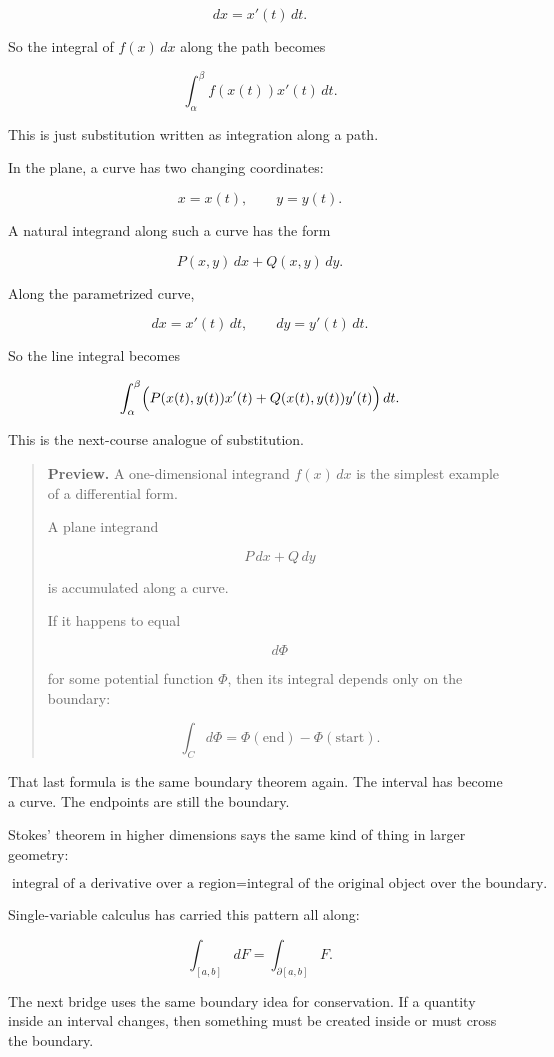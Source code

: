 \[
dx=x'(t)\,dt.
\]

So the integral of \(f(x)\,dx\) along the path becomes

\[
\int_{\alpha}^{\beta} f(x(t))x'(t)\,dt.
\]

This is just substitution written as integration along a path.

In the plane, a curve has two changing coordinates:

\[
x=x(t),
\qquad
y=y(t).
\]

A natural integrand along such a curve has the form

\[
P(x,y)\,dx+Q(x,y)\,dy.
\]

Along the parametrized curve,

\[
dx=x'(t)\,dt,
\qquad
dy=y'(t)\,dt.
\]

So the line integral becomes

\[
\int_{\alpha}^{\beta}
\Bigl(P(x(t),y(t))x'(t)+Q(x(t),y(t))y'(t)\Bigr)\,dt.
\]

This is the next-course analogue of substitution.

\begin{quote}
\textbf{Preview.}
A one-dimensional integrand \(f(x)\,dx\) is the simplest example of a differential
form.

A plane integrand

\[
P\,dx+Q\,dy
\]

is accumulated along a curve.

If it happens to equal

\[
d\Phi
\]

for some potential function \(\Phi\), then its integral depends only on the boundary:

\[
\int_C d\Phi=\Phi(\text{end})-\Phi(\text{start}).
\]
\end{quote}

That last formula is the same boundary theorem again.  The interval has become a
curve.  The endpoints are still the boundary.

Stokes' theorem in higher dimensions says the same kind of thing in larger geometry:

\[
\boxed{
\text{integral of a derivative over a region}
=
\text{integral of the original object over the boundary.}
}
\]

Single-variable calculus has carried this pattern all along:

\[
\boxed{
\int_{[a,b]} dF=\int_{\partial[a,b]} F.
}
\]

The next bridge uses the same boundary idea for conservation.  If a quantity inside an
interval changes, then something must be created inside or must cross the boundary.

